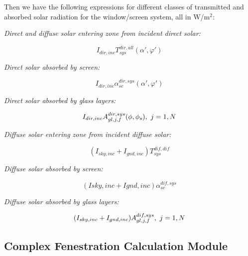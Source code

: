 Then we have the following expressions for different classes of transmitted and absorbed solar radiation for the window/screen system, all in W/m\(^{2}\):

\emph{Direct and diffuse solar entering zone from incident direct solar:}

\begin{equation}
{I_{dir,inc}}T_{sys}^{dir,all}\left( {\alpha ',\varphi '} \right)
\end{equation}

\emph{Direct solar absorbed by screen:}

\begin{equation}
{I_{dir,inc}}\alpha_{sc}^{dir,sys}\left( {\alpha ',\varphi '} \right)
\end{equation}

\emph{Direct solar absorbed by glass layers:}

\begin{equation}
{I_{dir,inc}}A_{gl,j,f}^{dir,sys}(\phi ,{\phi_s}),{\rm{    }}~j = 1,N
\end{equation}

\emph{Diffuse solar entering zone from incident diffuse solar:}

\begin{equation}
\left( {{I_{sky,inc}} + {I_{gnd,inc}}} \right)T_{sys}^{dif,dif}
\end{equation}

\emph{Diffuse solar absorbed by screen:}

\begin{equation}
\left( {Isky,inc + Ignd,inc} \right)\alpha_{sc}^{dif,sys}
\end{equation}

\emph{Diffuse solar absorbed by glass layers:}

\begin{equation}
({I_{sky,inc}} + {I_{gnd,inc}})A_{gl,j,f}^{dif,sys},{\rm{   }}~j = 1,N{\rm{ }}
\end{equation}

\subsection{Complex Fenestration Calculation Module}\label{complex-fenestration-calculation-module}

